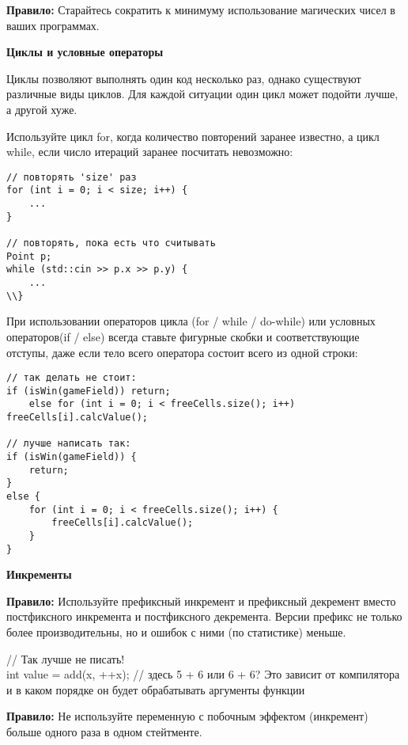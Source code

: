 \documentclass[a4paper,16pt]{report} %
\begin{document}
\begin{sloppypar}
\textbf{Правило:} Старайтесь сократить к минимуму использование магических чисел в ваших программах.
\end{sloppypar}

\begin{center}
	\textbf\large{\textbf{Циклы и условные операторы}}
\end{center}

Циклы позволяют выполнять один код несколько раз, однако существуют различные виды циклов. Для каждой ситуации один цикл может подойти лучше, а другой хуже.

Используйте цикл for, когда количество повторений заранее известно, а цикл while, если число итераций заранее посчитать невозможно:
\begin{verbatim}
// повторять 'size' раз
for (int i = 0; i < size; i++) {
    ...
}

// повторять, пока есть что считывать
Point p;
while (std::cin >> p.x >> p.y) {
    ...
\\}
\end{verbatim}
\begin{sloppypar}
	При использовании операторов цикла (for / while / do-while) или условных операторов(if / else) всегда ставьте фигурные скобки и соответствующие отступы, даже если тело всего оператора состоит всего из одной строки:
\end{sloppypar}
\begin{verbatim}
// так делать не стоит:
if (isWin(gameField)) return;
    else for (int i = 0; i < freeCells.size(); i++) freeCells[i].calcValue();

// лучше написать так:
if (isWin(gameField)) {
    return;
} 
else {
    for (int i = 0; i < freeCells.size(); i++) {
        freeCells[i].calcValue();
    }
}
\end{verbatim}

\begin{center}
	\textbf\large{\textbf{Инкременты}}
\end{center}

\begin{sloppypar}
\textbf{Правило:} Используйте префиксный инкремент и префиксный декремент вместо постфиксного инкремента и постфиксного декремента. Версии префикс не только более производительны, но и ошибок с ними (по статистике) меньше.
\end{sloppypar}
// Так лучше не писать!
\\
int value = add(x, ++x); // здесь 5 + 6 или 6 + 6? Это зависит от компилятора и в каком порядке он будет обрабатывать аргументы функции
\\
\begin{sloppypar}
\textbf{Правило:} Не используйте переменную с побочным эффектом (инкремент) больше одного раза в одном стейтменте.
\end{sloppypar}
\end{document}
